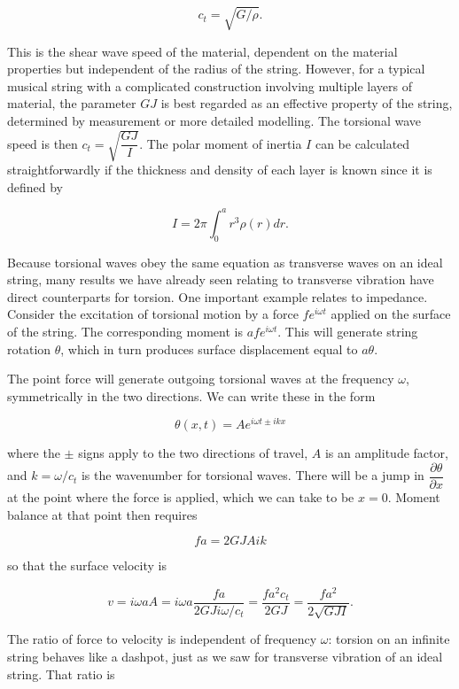   $$c_t=\sqrt{G/\rho}. \tag{5}$$ 

  This is the shear wave speed of the material, dependent on the material 
  properties but independent of the radius of the string. However, for a 
  typical musical string with a complicated construction involving multiple 
  layers of material, the parameter $GJ$ is best regarded as an effective 
  property of the string, determined by measurement or more detailed modelling. 
  The torsional wave speed is then $c_t=\sqrt{\dfrac{GJ}{I}}$. The polar moment 
  of inertia $I$ can be calculated straightforwardly if the thickness and 
  density of each layer is known since it is defined by 

  $$I= 2 \pi \int_0^a{r^3 \rho(r) dr} . \tag{6}$$ 

  Because torsional waves obey the same equation as transverse waves on an 
  ideal string, many results we have already seen relating to transverse 
  vibration have direct counterparts for torsion. One important example relates 
  to impedance. Consider the excitation of torsional motion by a force $fe^{i 
  \omega t}$ applied on the surface of the string. The corresponding moment is 
  $afe^{i \omega t}$. This will generate string rotation $\theta$, which in 
  turn produces surface displacement equal to $a \theta$. 

  The point force will generate outgoing torsional waves at the frequency 
  $\omega$, symmetrically in the two directions. We can write these in the form 

  $$\theta(x,t)= A e^{i \omega t \pm i k x} \tag{7}$$ 

  where the $\pm$ signs apply to the two directions of travel, $A$ is an 
  amplitude factor, and $k=\omega /c_t$ is the wavenumber for torsional waves. 
  There will be a jump in $\dfrac{\partial \theta}{\partial x}$ at the point 
  where the force is applied, which we can take to be $x=0$. Moment balance at 
  that point then requires 

  $$fa=2 G J A i k \tag{8}$$ 

  so that the surface velocity is 

  $$v = i \omega a A = i \omega a \dfrac{fa}{2GJ i \omega /c_t}=\dfrac{f a^2 
  c_t}{2GJ}=\dfrac{fa^2}{2 \sqrt{GJI}} . \tag{9}$$ 

  The ratio of force to velocity is independent of frequency $\omega$: torsion 
  on an infinite string behaves like a dashpot, just as we saw for transverse 
  vibration of an ideal string. That ratio is 

